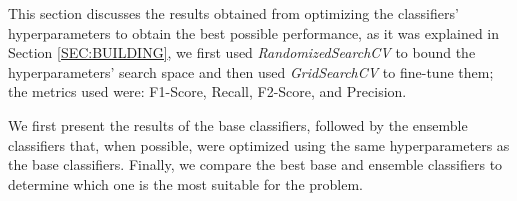 This section discusses the results obtained from optimizing the classifiers' hyperparameters to obtain the best possible performance, as it was explained in Section \ref{SEC:BUILDING}, we first used \textit{RandomizedSearchCV} to bound the hyperparameters' search space and then used \textit{GridSearchCV} to fine-tune them; the metrics used were: F1-Score, Recall, F2-Score, and Precision.

We first present the results of the base classifiers, followed by the ensemble classifiers that, when possible, were optimized using the same hyperparameters as the base classifiers. Finally, we compare the best base and ensemble classifiers to determine which one is the most suitable for the problem.